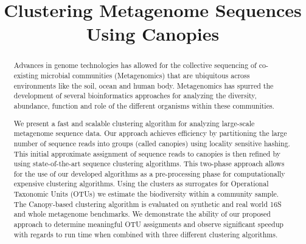 \documentclass[10pt, conference, compsocconf]{IEEEtran}
\begin{document}
\title{Clustering Metagenome Sequences Using Canopies}

\author{
}
\maketitle

\begin{abstract}
	
Advances in genome technologies 
has allowed for the 
collective sequencing of co-existing 
microbial communities (Metagenomics) that are ubiquitous 
across environments like the soil, ocean and human body.
%
Metagenomics has 
spurred the development of several 
bioinformatics approaches for analyzing 
the diversity, abundance, function and role of the 
different organisms 
within these communities. 
%


We present 
a fast and scalable 
clustering algorithm
for analyzing 
large-scale metagenome sequence
data. Our approach 
achieves efficiency 
by  
partitioning the large number of sequence reads into 
groups (called canopies) using locality sensitive 
hashing.  This 
initial approximate assignment of sequence reads to 
canopies is then 
refined by using 
state-of-the-art
sequence clustering 
algorithms. This
two-phase 
approach allows for the
use  of 
our developed algorithms as a pre-processing phase for 
computationally expensive 
clustering 
algorithms. Using the clusters as surrogates for 
Operational Taxonomic Units (OTUs) we 
estimate  the biodiversity within 
a community sample.
%
The Canopy-based clustering 
algorithm is evaluated on synthetic and real 
world 16S and whole 
metagenome  benchmarks. We demonstrate the ability 
of our proposed approach to  
determine meaningful OTU assignments and observe
significant speedup with regards 
to run time when combined with three 
different clustering algorithms. 


\end{abstract}
\end{document}
